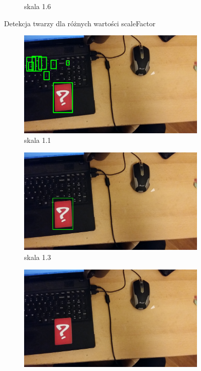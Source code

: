 \begin{figure}[H]
\begin{subfigure}{0.32\textwidth}
        \caption{skala 1.6}
        \label{fig:twarzSkala16}
    \end{subfigure}
    \caption{Detekcja twarzy dla różnych wartości scaleFactor}
    \label{twarzee}
\end{figure}

\begin{figure}[H]
    \centering
        \begin{subfigure}{0.32\textwidth}
        \centering
        \includegraphics[width=\linewidth]{imgs/karty11.jpg}
        \caption{skala 1.1}
        \label{fig:skalaKarta11}
    \end{subfigure}\hfill
    \begin{subfigure}{0.32\textwidth}
        \centering
        \includegraphics[width=\linewidth]{imgs/karta13.jpg}
        \caption{skala 1.3}
        \label{fig:skalaKarta13}
    \end{subfigure}\hfill
    \begin{subfigure}{0.32\textwidth}
        \centering
        \includegraphics[width=\linewidth]{imgs/kartaaskala20.jpg}

\end{subfigure}
\end{figure}
